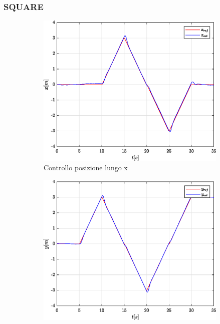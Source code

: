 \subsubsection{SQUARE}
\begin{figure}
	\centering
	\begin{subfigure}{0.45\textwidth}
		\centering
		\includegraphics[width=1\textwidth]{Simulazioni/Figure/SMC/SQUARE/PositionControlXPos}
		\caption{Controllo posizione lungo x}
	\end{subfigure}
	\hfill
	\begin{subfigure}{0.45\textwidth}
		\centering
		\includegraphics[width=1\textwidth]{Simulazioni/Figure/SMC/SQUARE/PositionControlYPos}

\end{subfigure}
\end{figure}
